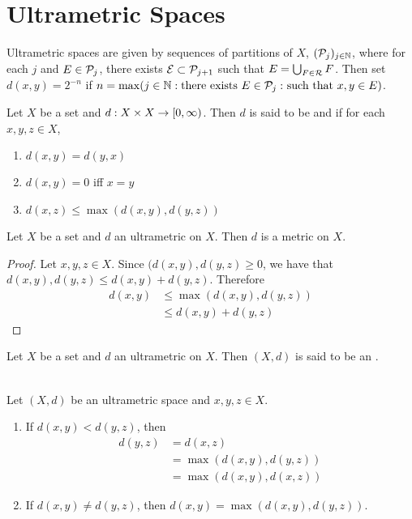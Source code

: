 \documentclass{book}
\begin{document}
\newpage
\section{Ultrametric Spaces}

Ultrametric spaces are given by sequences of partitions of $X$, $(\mathcal{P}_j)_{j \in \mathbb{N}}$, where for each $j$ and $E \in \mathcal{P}_j$, there exists $\mathcal{E} \subset \mathcal{P}_{j+1}$ such that $E = \bigcup_{F \in \mathcal{R}} F$. Then set $d(x, y) = 2^{-n}$ if $n = \max(j \in \mathbb{N}: \text{there exists $E \in \mathcal{P}_j:$ such that $x,y \in E$})$.

\begin{defn}
	Let $X$ be a set and $d:X \times X \rightarrow [0,\infty)$. Then $d$ is said to be and  if for each $x, y, z \in X$,
	\begin{enumerate}
		\item {} $d(x,y) = d(y,x)$
		\item {} $d(x,y) = 0$ iff $x= y$
		\item {} $d(x,z) \leq \max(d(x,y), d(y,z))$ 
	\end{enumerate} 
\end{defn}

\begin{ex}
	Let $X$ be a set and $d$ an ultrametric on $X$. Then $d$ is a metric on $X$.
\end{ex}

\begin{proof}
	Let $x,y,z \in X$. Since $(d(x,y) , d(y,z) \geq 0$, we have that $d(x,y), d(y,z) \leq  d(x,y) + d(y,z)$. Therefore
	\begin{align*}
		d(x,y)
		& \leq \max(d(x,y) , d(y,z)) \\
		& \leq  d(x,y) + d(y,z)
	\end{align*}
\end{proof}

\begin{defn}
	Let $X$ be a set and $d$ an ultrametric on $X$. Then $(X, d)$ is said to be an .
\end{defn}

\begin{ex}  \\
	Let $(X,d)$ be an ultrametric space and $x,y, z \in X$. 
	\begin{enumerate}
		\item If $d(x,y) < d(y,z)$, then 
		\begin{align*}
			d(y,z)
			& = d(x,z) \\
			& = \max(d(x,y), d(y,z)) \\
			& = \max(d(x,y), d(x,z))
		\end{align*}
		\item If $d(x,y) \neq d(y,z)$, then $d(x,y) = \max(d(x,y), d(y,z))$.
	\end{enumerate} 
\end{ex}
\end{document}
